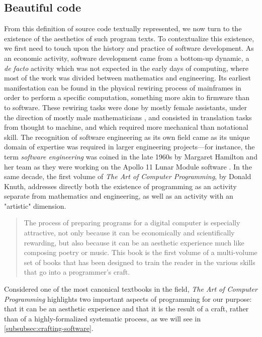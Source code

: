 \subsection{Beautiful code}
\label{subsec:beautiful-code}

From this definition of source code textually represented, we now turn to the existence of the aesthetics of such program texts. To contextualize this existence, we first need to touch upon the history and practice of software development. As an economic activity, software development came from a bottom-up dynamic, a \emph{de facto} activity which was not expected in the early days of computing, where most of the work was divided between mathematics and engineering. Its earliest manifestation can be found in the physical rewiring process of mainframes in order to perform a specific computation, something more akin to firmware than to software. These rewiring tasks were done by mostly female assistants, under the direction of mostly male mathematicians \citep{chun_software_2005}, and consisted in translation tasks from thought to machine, and which required more mechanical than notational skill. The recognition of software engineering as its own field came as its unique domain of expertise was required in larger engineering projects—for instance, the term \emph{software engineering} was coined in the late 1960s by Margaret Hamilton and her team as they were working on the Apollo 11 Lunar Module software \citep{mindell_digital_2011}. In the same decade, the first volume of \emph{The Art of Computer Programming}, by Donald Knuth, addresses directly both the existence of programming as an activity separate from mathematics and engineering, as well as an activity with an "artistic" dimension.

\begin{quote}
    The process of preparing programs for a digital computer is especially attractive, not only because it can be economically and scientifically rewarding, but also because it can be an aesthetic experience much like composing poetry or music. This book is the first volume of a multi-volume set of books that has been designed to train the reader in the various skills that go into a programmer's craft. \citep{knuth_art_1997}
\end{quote}

Considered one of the most canonical textbooks in the field, \emph{The Art of Computer Programming} highlights two important aspects of programming for our purpose: that it can be an aesthetic experience and that it is the result of a craft, rather than of a highly-formalized systematic process, as we will see in \autoref{subsubsec:crafting-software}.

